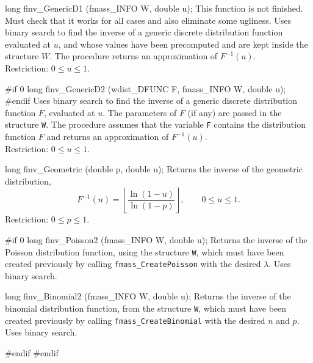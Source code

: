 long finv_GenericD1 (fmass_INFO W, double u);
\endcode
  \tab
This function is not finished. Must check that it works for all cases
and also eliminate some ugliness.
   Uses binary search to find the inverse of a generic discrete
   distribution function  evaluated at $u$, and whose values have been
   precomputed and are kept inside the structure $W$.
   The procedure  returns an approximation  of $F^{-1}(u)$. \\
   Restriction: $0 \le u \le 1$.
  \endtab
\code

#if 0
long finv_GenericD2 (wdist_DFUNC F, fmass_INFO W, double u);
#endif
\endcode
  \tab
   Uses binary search to find the inverse of a generic discrete
   distribution function $F$, evaluated at $u$.
   The parameters of $F$ (if any) are passed in the structure {\tt W}.
   The procedure assumes that the variable {\tt F}
   contains the distribution function $F$ and returns an approximation 
   of $F^{-1}(u)$. \\
   Restriction: $0 \le u \le 1$.
  \endtab
\endhide
\code


long finv_Geometric (double p, double u);
\endcode
  \tab Returns the inverse of the geometric distribution,
$$
   F^{-1}(u) = \left\lfloor \frac{\ln (1 - u)}{\ln (1 - p)}\right\rfloor,
               \qquad  0 \le u \le 1.
$$
  Restriction: $0 \le p \le 1$.
 \endtab
\code

\hide
#if 0
long finv_Poisson2 (fmass_INFO W, double u);
\endcode
 \tab  Returns the inverse of the Poisson distribution function,
  using the structure {\tt W}, which must have been created previously
  by calling {\tt fmass\_CreatePoisson} with the desired $\lambda$.
  Uses binary search.
 \endtab
\code


long finv_Binomial2 (fmass_INFO W, double u);
\endcode
 \tab  Returns the inverse of the binomial distribution function,
  from the structure {\tt W}, which must have been created previously
  by calling {\tt fmass\_CreateBinomial} with the desired $n$ and $p$.
  Uses binary search.
 \endtab
\code

#endif
#endif
\endhide
\endcode
